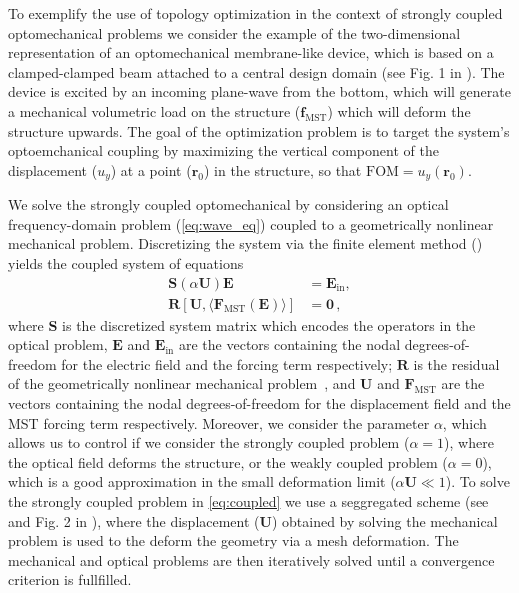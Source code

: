 To exemplify the use of topology optimization in the context of strongly coupled optomechanical problems we consider the example of the two-dimensional representation of an optomechanical membrane-like device, which
is based on a clamped-clamped beam attached to a central design domain (see Fig. 1 in ). The device is excited by an incoming plane-wave from the bottom, which will generate a mechanical volumetric load on the structure ($\mathbf{f}_\text{MST}$)
which will deform the structure upwards. The goal of the optimization problem is to target the system's optoemchanical coupling by maximizing the vertical component of the displacement ($u_y$) at a point ($\mathbf{r}_0$)
in the structure, so that $\text{FOM}=u_y(\mathbf{r}_0)$.

We solve the strongly coupled optomechanical by considering an optical frequency-domain problem (\eqref{eq:wave_eq}) coupled to a geometrically nonlinear mechanical problem. Discretizing the system via the finite element
method () yields the coupled system of equations
\begin{equation}\label{eq:coupled}
    \begin{aligned}
        \mathbf{S}\left(\alpha\mathbf{U}\right) \mathbf{E} &= \mathbf{E}_\text{in} , \\
        \mathbf{R}[\mathbf{U}, \langle \mathbf{F}_\text{MST}(\mathbf{E})\rangle] &=\mathbf{0}\,,
    \end{aligned}
    \end{equation}
where $\mathbf{S}$ is the discretized system matrix which encodes the operators
 in the optical problem, $\mathbf{E}$ and 
 $\mathbf{E}_\text{in}$ are the vectors containing the nodal degrees-of-freedom for the electric 
field and the forcing term respectively; $\mathbf{R}$ is the residual of the
 geometrically nonlinear mechanical problem~\cite{cook_concepts_2001}, and 
 $\mathbf{U}$ and $\mathbf{F}_\text{MST}$ are the vectors containing the nodal
  degrees-of-freedom for the displacement field and the MST forcing term respectively. 
  Moreover, we consider the parameter $\alpha$, which allows us to control if we consider 
  the strongly coupled problem ($\alpha=1$), where the optical field deforms the structure, 
  or the weakly coupled problem ($\alpha=0$), which is a good approximation in the small deformation 
  limit ($\alpha\mathbf{U} \ll 1$). To solve the strongly coupled problem in 
  \eqref{eq:coupled} we use a seggregated scheme (see  and Fig. 2 in ), where the displacement ($\mathbf{U}$) obtained
   by solving the mechanical problem is used to the deform the geometry via a mesh deformation. The mechanical and
    optical problems are then iteratively solved until a convergence criterion is fullfilled.


